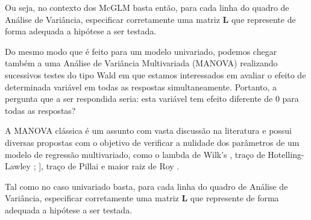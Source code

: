 Ou seja, no contexto dos McGLM basta então, para cada linha do quadro de Análise de Variância, especificar corretamente uma matriz $\boldsymbol{L}$ que represente de forma adequada a hipótese a ser testada.

Do mesmo modo que é feito para um modelo univariado, podemos chegar também a uma Análise de Variância Multivariada (MANOVA) realizando sucessivos testes do tipo Wald em que estamos interessados em avaliar o efeito de determinada variável em todas as respostas simultaneamente. Portanto, a pergunta que a ser respondida seria: esta variável tem efeito diferente de 0 para todas as respostas?

A MANOVA clássica \citep{manova} é um assunto com vasta discussão na literatura e possui diversas propostas com o objetivo de verificar a nulidade dos parâmetros de um modelo de regressão multivariado, como o lambda de Wilk's \citep{wilks}, traço de Hotelling-Lawley \citep{lawley}; \citep{hotelling}], traço de Pillai \citep{pillai} e maior raiz de Roy \citep{roy}.

Tal como no caso univariado basta, para cada linha do quadro de Análise de Variância, especificar corretamente uma matriz $\boldsymbol{L}$ que represente de forma adequada a hipótese a ser testada.
